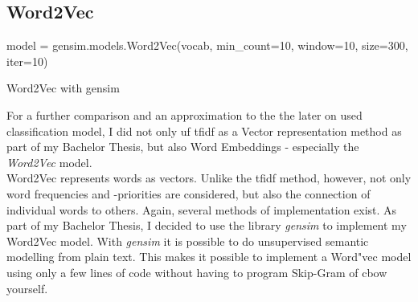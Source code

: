 \documentclass[a4paper, 11pt,titlepage,oneside,openany]{book}
\begin{document}
\newpage
\subsection{Word2Vec} 
\begin{algorithm}[H]
	\DontPrintSemicolon
	model = gensim.models.Word2Vec(vocab, min\_count=10, window=10, size=300, iter=10)\;
	\caption{Word2Vec with gensim}
\end{algorithm}
For a further comparison and an approximation to the the later on used classification model, I did not only uf \gls{tfidf} as a Vector representation method as part of my Bachelor Thesis, but also Word Embeddings - especially the \textit{Word2Vec} model. \\
Word2Vec represents words as vectors. Unlike the  \gls{tfidf} method, however, not only word frequencies and -priorities are considered, but also the connection of individual words to others. Again, several methods of implementation exist. 
\noindent As part of my Bachelor Thesis, I decided to use  the library \textit{gensim} \cite{gensim} to implement my Word2Vec model. With \textit{gensim} it is  possible to do  unsupervised semantic modelling from plain text. This makes it possible to implement a Word"vec model using only a few lines of code without having to program Skip-Gram of \gls{cbow} yourself. 
\end{document}
